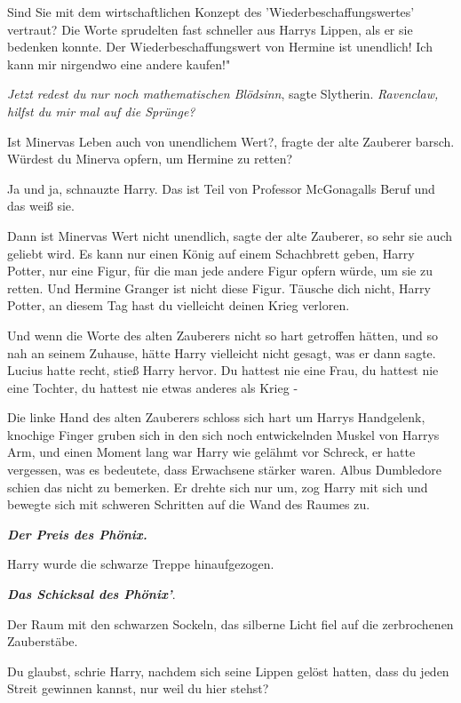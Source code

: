 \glqq{}Sind Sie mit dem wirtschaftlichen Konzept des 'Wiederbeschaffungswertes'
vertraut?\grqq{} Die Worte sprudelten fast schneller aus Harrys Lippen, als er
sie bedenken konnte. \glqq{}Der Wiederbeschaffungswert von Hermine ist unendlich!
Ich kann mir nirgendwo eine andere kaufen!"

\emph{Jetzt redest du nur noch mathematischen Blödsinn}, sagte Slytherin.
\emph{Ravenclaw, hilfst du mir mal auf die Sprünge?}

\glqq{}Ist Minervas Leben auch von unendlichem Wert?\grqq{}, fragte der alte
Zauberer barsch. \glqq{}Würdest du Minerva opfern, um Hermine zu retten?\grqq{}

\glqq{}Ja und ja\grqq{}, schnauzte Harry. \glqq{}Das ist Teil von Professor
McGonagalls Beruf und das weiß sie.\grqq{}

\glqq{}Dann ist Minervas Wert nicht unendlich\grqq{}, sagte der alte Zauberer,
\glqq{}so sehr sie auch geliebt wird. Es kann nur einen König auf einem
Schachbrett geben, Harry Potter, nur eine Figur, für die man jede andere Figur
opfern würde, um sie zu retten. Und Hermine Granger ist nicht diese Figur.
Täusche dich nicht, Harry Potter, an diesem Tag hast du vielleicht deinen Krieg
verloren.\grqq{}

Und wenn die Worte des alten Zauberers nicht so hart getroffen hätten, und so
nah an seinem Zuhause, hätte Harry vielleicht nicht gesagt, was er dann sagte.
\glqq{}Lucius hatte recht\grqq{}, stieß Harry hervor. \glqq{}Du hattest nie eine
Frau, du hattest nie eine Tochter, du hattest nie etwas anderes als Krieg
-\grqq{}

Die linke Hand des alten Zauberers schloss sich hart um Harrys Handgelenk,
knochige Finger gruben sich in den sich noch entwickelnden Muskel von Harrys
Arm, und einen Moment lang war Harry wie gelähmt vor Schreck, er hatte
vergessen, was es bedeutete, dass Erwachsene stärker waren. Albus Dumbledore
schien das nicht zu bemerken. Er drehte sich nur um, zog Harry mit sich und
bewegte sich mit schweren Schritten auf die Wand des Raumes zu.

\glqq{}\textbf{\emph{Der Preis des Phönix.}}\grqq{}

Harry wurde die schwarze Treppe hinaufgezogen.

\glqq{}\textbf{\emph{Das Schicksal des Phönix'}}.\grqq{}

Der Raum mit den schwarzen Sockeln, das silberne Licht fiel auf die zerbrochenen
Zauberstäbe.

\glqq{}Du glaubst\grqq{}, schrie Harry, nachdem sich seine Lippen gelöst hatten,
\glqq{}dass du jeden Streit gewinnen kannst, nur weil du hier stehst?\grqq{}

